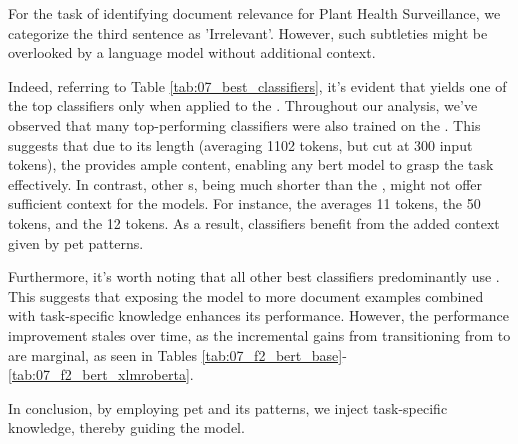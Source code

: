 For the task of identifying document relevance for Plant Health Surveillance, we categorize the third sentence as 'Irrelevant'. However, such subtleties might be overlooked by a language model without additional context.


Indeed, referring to Table \ref{tab:07_best_classifiers}, it's evident that \finetuning{} yields one of the top classifiers only when applied to the \trafilaturaFulltext{}. 
Throughout our analysis, we've observed that many top-performing classifiers were also trained on the \trafilaturaFulltext{}. 
This suggests that due to its length (averaging 1102 tokens, but cut at 300 input tokens), the \trafilaturaFulltext{} provides ample content, enabling any \gls{bert} model to grasp the task effectively.
In contrast, other \contentType{}s, being much shorter than the \trafilaturaFulltext{}, might not offer sufficient context for the models. For instance, the \trafilaturaTitle{} averages 11 tokens, the \trafilaturaAbstract{} 50 tokens, and the \translationTitle{} 12 tokens. 
As a result, classifiers benefit from the added context given by \gls{pet} patterns.

Furthermore, it's worth noting that all other best classifiers predominantly use \petThousand{}. 
This suggests that exposing the model to more document examples combined with task-specific knowledge enhances its performance.
However, the performance improvement stales over time, as the incremental gains from transitioning from \petFiveHundred{} to \petThousand{} are marginal, as seen in Tables \ref{tab:07_f2_bert_base}-\ref{tab:07_f2_bert_xlmroberta}.

In conclusion, by employing \gls{pet} and its patterns, we inject task-specific knowledge, thereby guiding the model. 


\clearpage